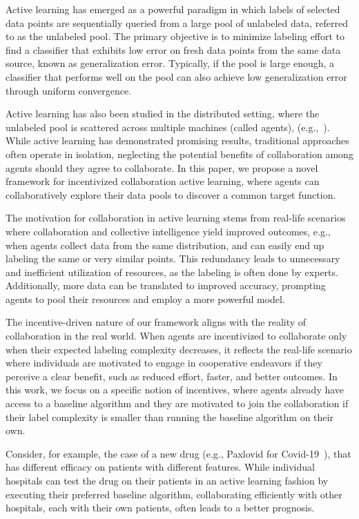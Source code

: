 Active learning has emerged as a powerful paradigm in which labels of selected data points are sequentially queried from a large pool of unlabeled data, referred to as the unlabeled pool. The primary objective is to minimize labeling effort to find a classifier that exhibits low error on fresh data points from the same data source, known as generalization error. 
Typically, if the pool is large enough, a classifier that performs well on the pool can also achieve low generalization error through uniform convergence. 

Active learning has also been studied in the distributed setting, where the unlabeled pool is scattered across multiple machines (called agents), (e.g.,~\cite{shen2016distributed,aussel2020combining}). 
While active learning has demonstrated promising results, traditional approaches often operate in isolation, neglecting the potential benefits 
of collaboration among agents should they agree to collaborate. In this paper, we propose a novel framework for incentivized collaboration active learning, where agents can collaboratively explore their data pools to discover a common target function.
%

The motivation for collaboration in active learning stems from real-life scenarios where collaboration and collective intelligence yield improved outcomes, e.g., when agents collect data from the same distribution, and can easily end up labeling the same or very similar points. This redundancy leads to unnecessary and inefficient utilization of resources, as the labeling is often done by experts. Additionally, more data can be translated to improved accuracy, prompting agents to pool their resources and employ a more powerful model.

The incentive-driven nature of our framework aligns with the reality of collaboration in the real world. When agents are incentivized to collaborate only when their expected labeling complexity decreases, it reflects the real-life scenario where individuals are motivated to engage in cooperative endeavors if they perceive a clear benefit, such as reduced effort, faster, and better outcomes. In this work, we focus on a specific notion of incentives, where agents already have access to a baseline algorithm and they are motivated to join the collaboration if their label complexity is smaller than running the baseline algorithm on their own.

Consider, for example, the case of a new drug (e.g., Paxlovid for Covid-19~\citep{Paxlovid22}), that has different efficacy on patients with different features. While individual hospitals can test the drug on their patients in an active learning fashion by executing their preferred baseline algorithm, collaborating efficiently with other hospitals, each with their own patients, often leads to a better prognosis. 


